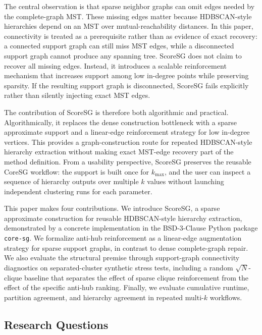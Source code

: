 \documentclass[11pt]{article}
\begin{document}
The central observation is that sparse neighbor graphs can omit edges needed by the complete-graph MST. These missing edges matter because HDBSCAN-style hierarchies depend on an MST over mutual-reachability distances. In this paper, connectivity is treated as a prerequisite rather than as evidence of exact recovery: a connected support graph can still miss MST edges, while a disconnected support graph cannot produce any spanning tree. ScoreSG does not claim to recover all missing edges. Instead, it introduces a scalable reinforcement mechanism that increases support among low in-degree points while preserving sparsity. If the resulting support graph is disconnected, ScoreSG fails explicitly rather than silently injecting exact MST edges.

The contribution of ScoreSG is therefore both algorithmic and practical. Algorithmically, it replaces the dense construction bottleneck with a sparse approximate support and a linear-edge reinforcement strategy for low in-degree vertices. This provides a graph-construction route for repeated HDBSCAN-style hierarchy extraction without making exact MST-edge recovery part of the method definition. From a usability perspective, ScoreSG preserves the reusable CoreSG workflow: the support is built once for \(k_{\max}\), and the user can inspect a sequence of hierarchy outputs over multiple \(k\) values without launching independent clustering runs for each parameter.

This paper makes four contributions. We introduce ScoreSG, a sparse approximate construction for reusable HDBSCAN-style hierarchy extraction, demonstrated by a concrete implementation in the BSD-3-Clause Python package \texttt{core-sg}. We formalize anti-hub reinforcement as a linear-edge augmentation strategy for sparse support graphs, in contrast to dense complete-graph repair. We also evaluate the structural premise through support-graph connectivity diagnostics on separated-cluster synthetic stress tests, including a random \(\sqrt{N}\)-clique baseline that separates the effect of sparse clique reinforcement from the effect of the specific anti-hub ranking. Finally, we evaluate cumulative runtime, partition agreement, and hierarchy agreement in repeated multi-\(k\) workflows.

\subsection{Research Questions}
\end{document}
